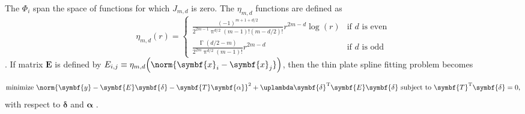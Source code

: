 The \(\Phi_i\) span the space of functions for which \(J_{m, d}\) is zero.  The \(\eta_{m, d}\) functions are defined as
\begin{equation}
  \label{eq:ThinPlateSplinesEtaFunctionDefinition}
  \eta_{m, d}(r) =
  \begin{cases}
    \frac{(-1)^{m + 1 + d / 2}}{2^{2m - 1}\uppi^{d / 2}(m - 1)!(m - d / 2)!}r^{2m - d}\log(r) & \text{if \(d\) is even} \\
    \frac{\upGamma (d / 2 - m)}{2^{2m}\uppi^{d / 2}(m - 1)!}r^{2m - d} & \text{if \(d\) is odd}
  \end{cases}
\end{equation}
\parencite{Wood2006}.  If matrix \(\symbf{E}\) is defined by \(E_{i, j} \equiv \eta_{m, d}\Bigl(\norm{\symbf{x}_i - \symbf{x}_j}\Bigr)\), then the thin plate spline fitting problem becomes

\begin{equation}
  \label{eq:ThinPlateSplineSimplifiedFittingProblem}
  \text{minimize } \norm{\symbf{y} - \symbf{E}\symbf{\delta} - \symbf{T}\symbf{\alpha}}^2 + \uplambda \symbf{\delta}^{\text{T}}\symbf{E}\symbf{\delta} \text{ subject to } \symbf{T}^{\text{T}}\symbf{\delta} = 0,
\end{equation}
with respect to \(\symbf{\delta}\) and \(\symbf{\alpha}\) \parencite{Wood2006}.

